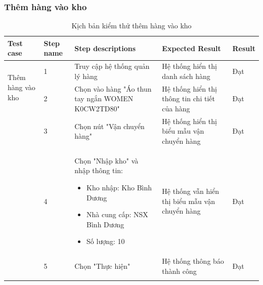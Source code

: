 \subsubsection{Thêm hàng vào kho}
{
    \setlength\extrarowheight{6pt}
    \begin{longtable}{| p{2.5cm}| p{1cm}| p{5.5cm}| p{4.5cm} | p{1.5cm} |}
        \hline
        \textbf{Test case}                        & \textbf{Step name}                             & \textbf{Step descriptions}                       & \textbf{Expected Result}                      & \textbf{Result} \\
        \hline
        \multirow[t]{2}{2.5cm}{Thêm hàng vào kho} & 1                                              & Truy cập hệ thống quản lý hàng                   & Hệ thống hiển thị danh sách hàng              & Đạt             \\
        \cline{2-5}
                                                  & 2                                              & Chọn vào hàng "Áo thun tay ngắn WOMEN K0CW2TD80" & Hệ thống hiển thị thông tin chi tiết của hàng & Đạt             \\
        \cline{2-5}
                                                  & 3                                              & Chọn nút "Vận chuyển hàng"                       & Hệ thống hiển thị biểu mẫu vận chuyển hàng    & Đạt             \\
        \cline{2-5}
                                                  & 4                                              & Chọn "Nhập kho" và nhập thông tin:
        \begin{itemize}
            \item Kho nhập: Kho Bình Dương
            \item Nhà cung cấp: NSX Bình Dương
            \item Số lượng: 10
        \end{itemize}
                                                  & Hệ thống vẫn hiển thị biểu mẫu vận chuyển hàng & Đạt                                                                                                                \\
        \cline{2-5}
                                                  & 5                                              & Chọn "Thực hiện"                                 & Hệ thống thông báo thành công                 & Đạt             \\
        \hline
        \caption{Kịch bản kiểm thử thêm hàng vào kho}
    \end{longtable}
}

